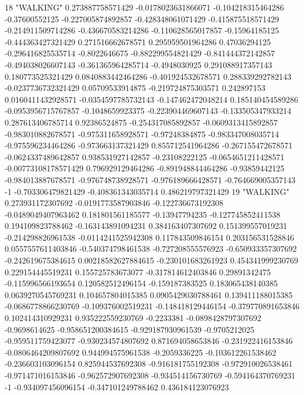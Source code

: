 18 "WALKING" 0.273887758571429 -0.0178023631866071 -0.104218315464286 -0.37600552125 -0.227005874892857 -0.428348061071429 -0.415875518571429 -0.214911509714286 -0.436670583214286 -0.110628565017857 -0.15964185125 -0.444363427321429 0.271516662678571 0.295959501964286 0.47036294125 -0.296416825535714 -0.8022646675 -0.882299554821429 -0.841444372142857 -0.494038026607143 -0.361365964285714 -0.4948030925 0.291088917357143 0.180773525321429 0.0840883442464286 -0.401924532678571 0.288339292782143 -0.0237736732321429 0.05709533914875 -0.219724875303571 0.242897153 0.0160411432928571 -0.0354597785732143 -0.147462472048214 0.185140454589286 -0.0953956715767857 -0.1048659923375 -0.223904469607143 -0.133505347933214 0.287613406785714 0.92386524875 -0.254317085892857 -0.0609313415892857 -0.983010882678571 -0.975311658928571 -0.97248384875 -0.983347008035714 -0.975596234464286 -0.973663137321429 0.855712541964286 -0.267155472678571 -0.0624337489642857 0.938531927142857 -0.23108222125 -0.0654651211428571 -0.00773108178571429 0.796929129464286 -0.891948844464286 -0.93859442125 -0.984013887678571 -0.976748738928571 -0.976189666428571 -0.764669005357143 -1 -0.703306479821429 -0.408361343035714 0.486219797321429
19 "WALKING" 0.273931172307692 -0.0191773587903846 -0.122736673192308 -0.0489049407963462 0.181801561185577 -0.13947794235 -0.127745852411538 0.194109823788462 -0.163143891094231 0.384163407307692 0.151399557019231 -0.214298826961538 -0.0114241525942308 0.117843509846154 0.203156531528846 0.0557557611403846 -0.540374798461538 -0.727208555576923 -0.650933357307692 -0.242619675384615 0.00218582627884615 -0.230101683261923 0.454341999230769 0.229154445519231 0.155725783673077 -0.317814612403846 0.29891342475 -0.115996566193654 0.120582512496154 -0.159187383525 0.183065438140385 0.0639270545769231 0.104657804015385 0.0905429030788461 0.139411188015385 -0.0686778866230769 -0.109376002519231 -0.148418129446154 -0.379770891653846 0.102414310929231 0.935222559230769 -0.2233381 -0.0898428797307692 -0.9698614625 -0.958651200384615 -0.929187930961539 -0.9705212025 -0.959511759423077 -0.930234574807692 0.871694058653846 -0.231922416153846 -0.0806464209807692 0.944994575961538 -0.2059336225 -0.103612261538462 -0.236603103096154 0.825944537692308 -0.916181755192308 -0.972910026538461 -0.971471016153846 -0.962572907692308 -0.934514156730769 -0.594164370769231 -1 -0.934097456096154 -0.347101249788462 0.436184123076923
